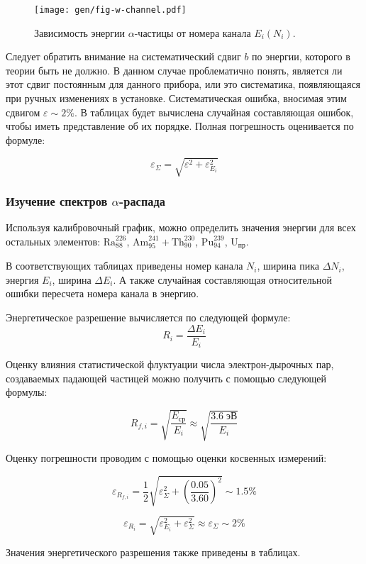 \documentclass[10pt,a4paper]{article}
\begin{document}
\begin{multicols}{2}
	\begin{figure}[H]
		\texttt{[image: gen/fig-w-channel.pdf]}
		\caption{Зависимость энергии $\alpha$-частицы от номера канала $E_i(N_i)$.}
		\label{fig:w-channel}
	\end{figure}

	Следует обратить внимание на систематический сдвиг $b$ по энергии, которого в теории быть не должно. В данном случае проблематично понять, является ли этот сдвиг постоянным для данного прибора, или это систематика, появляющаяся при ручных изменениях в установке. Систематическая ошибка, вносимая этим сдвигом $\varepsilon \sim 2\%$. В таблицах будет вычислена случайная составляющая ошибок, чтобы иметь представление об их порядке. Полная погрешность оценивается по формуле:
	
	$$\varepsilon_\Sigma = \sqrt{\varepsilon^2 + \varepsilon_{E_i}^2}$$
	
	\subsubsection*{Изучение спектров $\alpha$-распада}
			
	Используя калибровочный график, можно определить значения энергии для всех остальных элементов: $\text{Ra}_{88}^{226}$, $\text{Am}_{95}^{241} + \text{Th}_{90}^{230}$, $\text{Pu}_{94}^{239}$, $\text{U}_{\text{пр}}$.
	
	В соответствующих таблицах приведены номер канала $N_i$, ширина пика $\Delta N_i$, энергия $E_i$, ширина $\Delta E_i$. А также случайная составляющая относительной ошибки пересчета номера канала в энергию.
	
	Энергетическое разрешение вычисляется по следующей формуле:
	$$R_i = \frac{\Delta E_i}{E_i}$$
	
	Оценку влияния статистической флуктуации числа электрон-дырочных пар, создаваемых падающей частицей можно получить с помощью следующей формулы:
	
	$$R_{f,i} = \sqrt{\frac{E_{\text{ср}}}{E_i}} \approx \sqrt{\frac{3.6\; \text{эВ}}{E_i}}$$

	Оценку погрешности проводим с помощью оценки косвенных измерений:
	
	$$ \varepsilon_{R_{f,i}} = \frac{1}{2} \sqrt{\varepsilon_\Sigma^2 + \left(\frac{0.05}{3.60}\right)^2} \sim 1.5 \%$$

		
	$$ \varepsilon_{R_i} = \sqrt{\varepsilon_{E_i}^2 + \varepsilon_{\Sigma}^2} \approx  \varepsilon_{\Sigma} \sim 2 \%$$

	Значения энергетического разрешения также приведены в таблицах.


\end{multicols}
\end{document}
